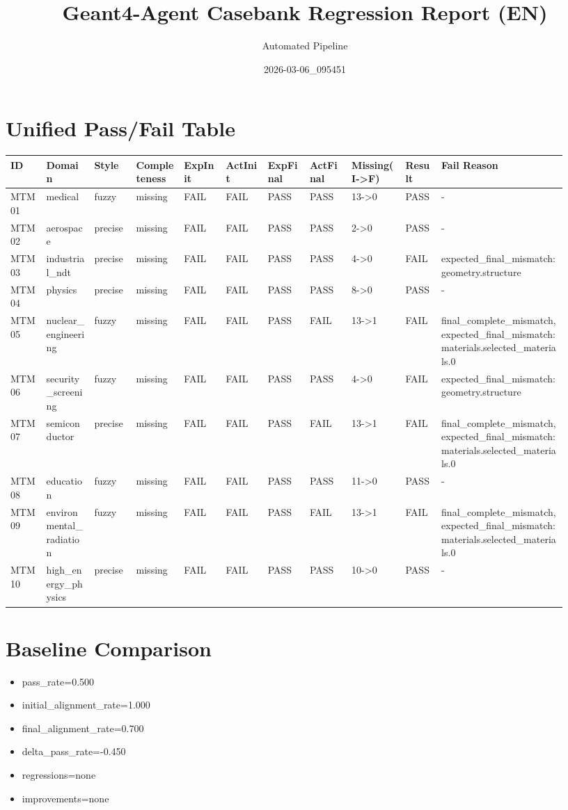 \documentclass[11pt]{ctexart}
\title{Geant4-Agent Casebank Regression Report (EN)}
\author{Automated Pipeline}
\date{2026-03-06\_095451}
\begin{document}
\maketitle
\section{Unified Pass/Fail Table}
\begin{longtable}{p{0.06\linewidth}p{0.08\linewidth}p{0.07\linewidth}p{0.08\linewidth}p{0.07\linewidth}p{0.07\linewidth}p{0.07\linewidth}p{0.07\linewidth}p{0.09\linewidth}p{0.06\linewidth}p{0.21\linewidth}}
\toprule
ID & Domain & Style & Completeness & ExpInit & ActInit & ExpFinal & ActFinal & Missing(I->F) & Result & Fail Reason \\
\midrule
MTM01 & medical & fuzzy & missing & FAIL & FAIL & PASS & PASS & 13->0 & PASS & - \\
MTM02 & aerospace & precise & missing & FAIL & FAIL & PASS & PASS & 2->0 & PASS & - \\
MTM03 & industrial\_ndt & precise & missing & FAIL & FAIL & PASS & PASS & 4->0 & FAIL & expected\_final\_mismatch:geometry.structure \\
MTM04 & physics & precise & missing & FAIL & FAIL & PASS & PASS & 8->0 & PASS & - \\
MTM05 & nuclear\_engineering & fuzzy & missing & FAIL & FAIL & PASS & FAIL & 13->1 & FAIL & final\_complete\_mismatch, expected\_final\_mismatch:materials.selected\_materials.0 \\
MTM06 & security\_screening & fuzzy & missing & FAIL & FAIL & PASS & PASS & 4->0 & FAIL & expected\_final\_mismatch:geometry.structure \\
MTM07 & semiconductor & precise & missing & FAIL & FAIL & PASS & FAIL & 13->1 & FAIL & final\_complete\_mismatch, expected\_final\_mismatch:materials.selected\_materials.0 \\
MTM08 & education & fuzzy & missing & FAIL & FAIL & PASS & PASS & 11->0 & PASS & - \\
MTM09 & environmental\_radiation & fuzzy & missing & FAIL & FAIL & PASS & FAIL & 13->1 & FAIL & final\_complete\_mismatch, expected\_final\_mismatch:materials.selected\_materials.0 \\
MTM10 & high\_energy\_physics & precise & missing & FAIL & FAIL & PASS & PASS & 10->0 & PASS & - \\
\bottomrule
\end{longtable}
\section{Baseline Comparison}
\begin{itemize}
\item pass\_rate=0.500
\item initial\_alignment\_rate=1.000
\item final\_alignment\_rate=0.700
\item delta\_pass\_rate=-0.450
\item regressions=none
\item improvements=none
\end{itemize}
\appendix
\end{document}
